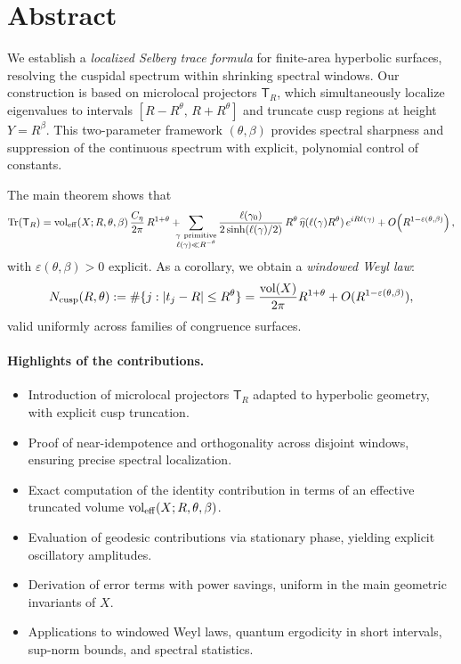 \section*{Abstract}\label{sec:abstract}

We establish a \emph{localized Selberg trace formula} for finite-area hyperbolic surfaces,
resolving the cuspidal spectrum within shrinking spectral windows.  
Our construction is based on microlocal projectors $\mathsf{T}_R$, which simultaneously
localize eigenvalues to intervals $[R-R^\theta,\,R+R^\theta]$ and truncate cusp regions at
height $Y=R^\beta$.  
This two-parameter framework $(\theta,\beta)$ provides spectral sharpness and suppression
of the continuous spectrum with explicit, polynomial control of constants.

The main theorem shows that
\[
  \mathrm{Tr}(\mathsf{T}_R)
   = \operatorname{vol}_{\mathrm{eff}}(X;R,\theta,\beta)\,\frac{C_\eta}{2\pi}\,R^{1+\theta}
   + \!\!\!\!\sum_{\substack{\gamma\ \text{primitive}\\ \ell(\gamma)\ll R^{-\theta}}}
     \frac{\ell(\gamma_0)}{2\sinh(\ell(\gamma)/2)}\,R^\theta
     \,\widehat{\eta}(\ell(\gamma)R^\theta)\, e^{iR\ell(\gamma)}
   + O\!\left(R^{1-\varepsilon(\theta,\beta)}\right),
\]
with $\varepsilon(\theta,\beta)>0$ explicit.  
As a corollary, we obtain a \emph{windowed Weyl law}:
\[
  N_{\mathrm{cusp}}(R,\theta) :=
    \#\{j : |t_j-R|\leq R^\theta\}
  = \frac{\operatorname{vol}(X)}{2\pi} R^{1+\theta}
    + O(R^{1-\varepsilon(\theta,\beta)}),
\]
valid uniformly across families of congruence surfaces.

\paragraph{Highlights of the contributions.}
\begin{itemize}
  \item Introduction of microlocal projectors $\mathsf{T}_R$ adapted to hyperbolic geometry,
        with explicit cusp truncation.
  \item Proof of near-idempotence and orthogonality across disjoint windows, ensuring
        precise spectral localization.
  \item Exact computation of the identity contribution in terms of an effective truncated
        volume $\operatorname{vol}_{\mathrm{eff}}(X;R,\theta,\beta)$.
  \item Evaluation of geodesic contributions via stationary phase, yielding explicit
        oscillatory amplitudes.
  \item Derivation of error terms with power savings, uniform in the main geometric
        invariants of $X$.
  \item Applications to windowed Weyl laws, quantum ergodicity in short intervals, sup-norm
        bounds, and spectral statistics.
\end{itemize}

